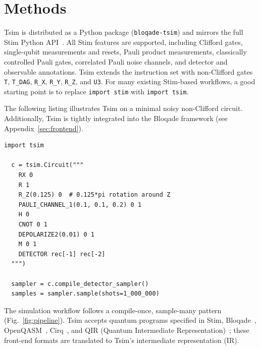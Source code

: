 \documentclass[
  a4paper,
  onecolumn,
  11pt,
  allowtoday
]{quantumarticle}
\begin{document}

\section{Methods}
\label{sec:pipeline}

Tsim is distributed as a Python package (\texttt{bloqade-tsim}) and mirrors the full Stim Python API~\cite{gidney2021stim}. All Stim features are supported, including Clifford gates, single-qubit measurements and resets, Pauli product measurements, classically controlled Pauli gates, correlated Pauli noise channels, and detector and observable annotations. Tsim extends the instruction set with non-Clifford gates \texttt{T}, \texttt{T\_DAG}, \texttt{R\_X}, \texttt{R\_Y}, \texttt{R\_Z}, and \texttt{U3}. For many existing Stim-based workflows, a good starting point is to replace \texttt{import stim} with \texttt{import tsim}.

The following listing illustrates Tsim on a minimal noisy non-Clifford circuit. Additionally, Tsim is tightly integrated into the Bloqade framework \cite{bloqade2025} (see Appendix~\ref{sec:frontend}).

\begin{lstlisting}[caption={Minimal Tsim detector-sampling example.}, label={lst:detector_sampling}]
  import tsim

  c = tsim.Circuit("""
    RX 0
    R 1
    R_Z(0.125) 0  # 0.125*pi rotation around Z
    PAULI_CHANNEL_1(0.1, 0.1, 0.2) 0 1
    H 0
    CNOT 0 1
    DEPOLARIZE2(0.01) 0 1
    M 0 1
    DETECTOR rec[-1] rec[-2]
  """)

  sampler = c.compile_detector_sampler()
  samples = sampler.sample(shots=1_000_000)
\end{lstlisting}

The simulation workflow follows a compile-once, sample-many pattern (Fig.~\ref{fig:pipeline}). Tsim accepts quantum programs specified in Stim,
Bloqade~\cite{bloqade2025},
OpenQASM~\cite{cross2017open},
Cirq~\cite{cirq2025},
and QIR (Quantum Intermediate Representation)~\cite{qir2026spec}; these front-end formats are translated to Tsim's intermediate representation (IR).
\end{document}
